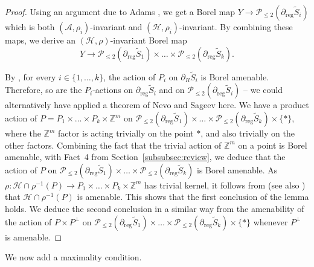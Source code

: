 \documentclass[JEP,XML,SOM,Unicode,NoFloatCountersInSection,published]{cedram}
\let\mathcal\mathscr
\theoremstyle{plain}
\theoremstyle{definition}
\newcommand{\cala}{\mathcal{A}}
\newcommand{\calh}{\mathcal{H}}
\newcommand{\calp}{\mathcal{P}}
\newcommand{\reg}{\mathrm{reg}}
\begin{document}
\begin{proof}
Using an argument due to Adams \cite[Lem.\,3.2 \&~3.3]{Ada}, we get a Borel map $Y\to \calp_{\le 2}(\partial_\reg \widetilde{S}_i)$ which is both $(\cala,\rho_i)$-invariant and $(\calh,\rho_i)$-invariant. By combining these maps, we derive an $(\calh,\rho)$-invariant Borel map\vspace*{-3pt}
\[
Y\to \calp_{\le 2}(\partial_\reg \widetilde{S}_1)\times\dots\times \calp_{\le 2}(\partial_\reg \widetilde{S}_k).
\]

By \cite[Th.\,5.11]{Duc}, for every $i\in\{1,\dots,k\}$, the action of $P_i$ on $\partial_R \widetilde{S}_i$ is Borel amenable. Therefore, so are the $P_i$-actions on $\partial_\reg \widetilde{S}_i$ and on $\calp_{\le 2}(\partial_\reg\widetilde{S}_i)$ -- we could alternatively have applied a theorem of Nevo and Sageev \cite[Th.\,7.2]{NS} here. We have a product action of $P=P_1\times\dots\times P_k\times \mathbb{Z}^m$ on $\calp_{\le 2}(\partial_\reg \widetilde{S}_1)\times\dots\times \calp_{\le 2}(\partial_\reg \widetilde{S}_k)\times\{*\}$, where the $\mathbb{Z}^m$ factor is acting trivially on the point $\ast$, and also trivially on the other factors. Combining the fact that the trivial action of $\mathbb{Z}^m$ on a point is Borel amenable, with Fact~4 from Section~\ref{subsubsec:review}, we deduce that the action of $P$ on $\calp_{\le 2}(\partial_\reg \widetilde{S}_1)\times\dots\times \calp_{\le 2}(\partial_\reg \widetilde{S}_k)$ is Borel amenable. As $\rho:\calh \cap\rho^{-1}(P)\to P_1\times\dots\times P_k\times\mathbb{Z}^m$ has trivial kernel, it follows from \cite[Prop.\,4.33]{Kid-memoir} (see also \cite[Prop.\,3.38]{GH}) that $\calh \cap\rho^{-1}(P)$ is amenable. This shows that the first conclusion of the lemma holds. We deduce the second conclusion in a similar way from the amenability of the action of $P\times P^\perp$ on $\calp_{\le 2}(\partial_\reg \widetilde{S}_1)\times\dots\times \calp_{\le 2}(\partial_\reg \widetilde{S}_k)\times\{*\}$ whenever $P^\perp$ is amenable.
\end{proof}

We now add a maximality condition.
\end{document}
